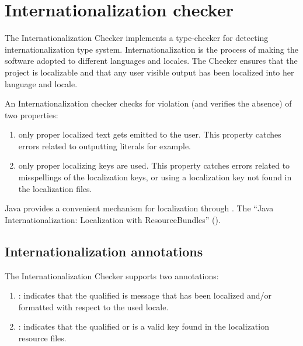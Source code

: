 \htmlhr
\chapter{Internationalization checker\label{i18n-checker}}

The Internationalization Checker implements a type-checker for detecting
internationalization type system.  Internationalization is the process
of making the software adopted to different languages and locales.  The
Checker ensures that the project is localizable and that any user visible
output has been localized into her language and locale.

An Internationalization checker checks for violation (and verifies the
absence) of two properties:

\begin{enumerate}

\item only proper localized text gets emitted to the user.  This property
catches errors related to outputting  literals for example.

\item only proper localizing keys are used.  This property catches errors
related to misspellings of the localization keys, or using a localization
key not found in the localization files.

\end{enumerate}

Java provides a convenient mechanism for localization through
.  The ``Java
Internationalization: Localization with ResourceBundles''
 ().

\section{Internationalization annotations}

The Internationalization Checker supports two annotations:

\begin{enumerate}
\item {}: indicates that the qualified
 is message that has been localized and/or formatted with
respect to the used locale.

\item {}: indicates that the
qualified  or  is a valid key found in the
localization resource files.
\end{enumerate}

